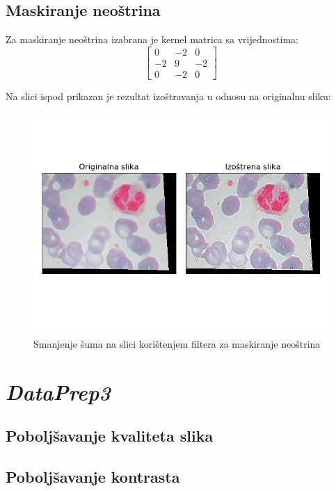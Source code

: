 \documentclass[12pt,a4paper]{article}
\begin{document}
\subsection{Maskiranje neoštrina}

Za maskiranje neoštrina izabrana je kernel matrica sa vrijednostima:
\[
\begin{bmatrix}
    0 & -2 & 0 \\
    -2 & 9 & -2 \\
    0 & -2 & 0
\end{bmatrix}
\]

Na slici ispod prikazan je rezultat izoštravanja u odnosu na originalnu sliku:


\begin{figure}[H]

	\center
	\includegraphics[scale=0.9]{s2MaskiranjeNeostrina.png}
	\caption{Smanjenje šuma na slici korištenjem filtera za maskiranje neoštrina}
	
\end{figure}

\newpage

\section{\textit{DataPrep3}}

\subsection{Poboljšavanje kvaliteta slika}

\subsection{Poboljšavanje kontrasta}
\end{document}
